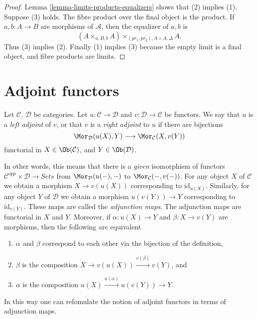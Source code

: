 \begin{proof}
Lemma \ref{lemma-limits-products-equalizers} shows that (2) implies (1).
Suppose (3) holds. The fibre product over the final object is the product.
If $a, b : A \to B$ are morphisms of $\mathcal{A}$, then the
equalizer of $a, b$ is
$$
(A \times_{a, B, b} A)\times_{(pr_1, pr_2), A \times A, \Delta} A.
$$
Thus (3) implies (2). Finally (1) implies (3) because
the empty limit is a final object, and fibre products are limits.
\end{proof}


\section{Adjoint functors}
\label{section-adjoint}

\begin{definition}
\label{definition-adjoint}
Let $\mathcal{C}$, $\mathcal{D}$ be categories.
Let $u : \mathcal{C} \to \mathcal{D}$ and
$v : \mathcal{D} \to \mathcal{C}$ be functors.
We say that $u$ is a {\it left adjoint} of $v$, or that
$v$ is a {\it right adjoint} to $u$ if there are bijections
$$
\Mor_\mathcal{D}(u(X), Y)
\longrightarrow
\Mor_\mathcal{C}(X, v(Y))
$$
functorial in $X \in \Ob(\mathcal{C})$, and
$Y \in \Ob(\mathcal{D})$.
\end{definition}

\noindent
In other words, this means that there is a {\it given} isomorphism of functors
$\mathcal{C}^{opp} \times \mathcal{D} \to \textit{Sets}$ from
$\Mor_\mathcal{D}(u(-), -)$ to $\Mor_\mathcal{C}(-, v(-))$. For any object
$X$ of $\mathcal{C}$ we obtain a morphism $X \to v(u(X))$ corresponding to
$\text{id}_{u(X)}$. Similarly, for any object $Y$ of $\mathcal{D}$ we obtain
a morphism $u(v(Y)) \to Y$ corresponding to $\text{id}_{v(Y)}$.
These maps are called the {\it adjunction maps}. The adjunction maps
are functorial in $X$ and $Y$. Moreover, if $\alpha : u(X) \to Y$
and $\beta : X \to v(Y)$ are morphisms, then the following are equivalent
\begin{enumerate}
\item $\alpha$ and $\beta$ correspond to each other via the
bijection of the definition,
\item $\beta$ is the composition $X \to v(u(X)) \xrightarrow{v(\beta)} v(Y)$,
and
\item $\alpha$ is the composition $u(X) \xrightarrow{u(\alpha)} u(v(Y)) \to Y$.
\end{enumerate}
In this way one can refomulate the notion of adjoint functors in terms
of adjunction maps.

